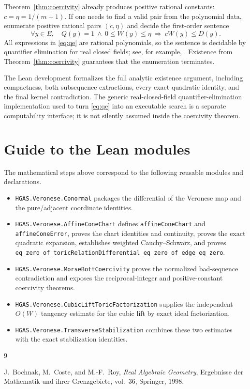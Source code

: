\documentclass[11pt]{article}
\theoremstyle{definition}
\theoremstyle{remark}
\begin{document}
Theorem~\ref{thm:coercivity} already produces positive rational
constants: \(c=\eta=1/(m+1)\).  If one needs to find a valid pair from
the polynomial data, enumerate positive rational pairs \((c,\eta)\) and
decide the first-order sentence
\[
  \forall y\in E,\quad
  Q(y)=1\ \wedge\ 0\leq W(y)\leq\eta
  \ \Longrightarrow\ cW(y)\leq D(y).
  \tag{14}\label{eq:qe}
\]
All expressions in \eqref{eq:qe} are rational polynomials, so the
sentence is decidable by quantifier elimination for real closed fields;
see, for example, \cite[Chapters 1 and 2]{BCR}.  Existence from
Theorem~\ref{thm:coercivity} guarantees that the enumeration terminates.

The Lean development formalizes the full analytic existence argument,
including compactness, both subsequence extractions, every exact
quadratic identity, and the final kernel contradiction.  The generic
real-closed-field quantifier-elimination implementation used to turn
\eqref{eq:qe} into an executable search is a separate computability
interface; it is not silently assumed inside the coercivity theorem.

\section{Guide to the Lean modules}

The mathematical steps above correspond to the following reusable
modules and declarations.
\begin{itemize}
\item \texttt{HGAS.Veronese.Conormal} packages the differential of the
      Veronese map and the pure/adjacent coordinate identities.
\item \texttt{HGAS.Veronese.AffineConeChart} defines
      \texttt{affineConeChart} and \texttt{affineConeError}, proves the
      chart identities and continuity, proves the exact quadratic
      expansion, establishes weighted Cauchy--Schwarz, and proves
      \texttt{eq\_zero\_of\_toricRelationDifferential\_eq\_zero\_of\_edge\_eq\_zero}.
\item \texttt{HGAS.Veronese.MorseBottCoercivity} proves the normalized
      bad-sequence contradiction and exposes the reciprocal-integer and
      positive-constant coercivity theorems.
\item \texttt{HGAS.Veronese.CubicLiftToricFactorization} supplies the
      independent \(O(W)\) tangency estimate for the cubic lift by exact
      ideal factorization.
\item \texttt{HGAS.Veronese.TransverseStabilization} combines these two
      estimates with the exact stabilization identities.
\end{itemize}

\begin{thebibliography}{9}

J.~Bochnak, M.~Coste, and M.-F.~Roy,
\emph{Real Algebraic Geometry},
Ergebnisse der Mathematik und ihrer Grenzgebiete, vol.~36,
Springer, 1998.

\end{thebibliography}
\end{document}
